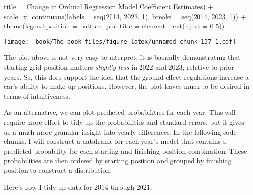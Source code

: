 \documentclass[
]{book}
\newenvironment{Shaded}{\begin{snugshade}}{\end{snugshade}}
\newcommand{\AttributeTok}[1]{\textcolor[rgb]{0.77,0.63,0.00}{#1}}
\newcommand{\DecValTok}[1]{\textcolor[rgb]{0.00,0.00,0.81}{#1}}
\newcommand{\FloatTok}[1]{\textcolor[rgb]{0.00,0.00,0.81}{#1}}
\newcommand{\FunctionTok}[1]{\textcolor[rgb]{0.00,0.00,0.00}{#1}}
\newcommand{\NormalTok}[1]{#1}
\newcommand{\SpecialCharTok}[1]{\textcolor[rgb]{0.00,0.00,0.00}{#1}}
\newcommand{\StringTok}[1]{\textcolor[rgb]{0.31,0.60,0.02}{#1}}
\begin{document}
\begin{Shaded}
\begin{Highlighting}[]
       \AttributeTok{title =} \StringTok{\textquotesingle{}Change in Ordinal Regression Model Coefficient Estimates\textquotesingle{}}\NormalTok{) }\SpecialCharTok{+}
  \FunctionTok{scale\_x\_continuous}\NormalTok{(}\AttributeTok{labels =} \FunctionTok{seq}\NormalTok{(}\DecValTok{2014}\NormalTok{, }\DecValTok{2023}\NormalTok{, }\DecValTok{1}\NormalTok{),}
                     \AttributeTok{breaks =} \FunctionTok{seq}\NormalTok{(}\DecValTok{2014}\NormalTok{, }\DecValTok{2023}\NormalTok{, }\DecValTok{1}\NormalTok{)) }\SpecialCharTok{+}
  \FunctionTok{theme}\NormalTok{(}\AttributeTok{legend.position =} \StringTok{\textquotesingle{}bottom\textquotesingle{}}\NormalTok{,}
        \AttributeTok{plot.title =} \FunctionTok{element\_text}\NormalTok{(}\AttributeTok{hjust =} \FloatTok{0.5}\NormalTok{))}
\end{Highlighting}
\end{Shaded}

\texttt{[image: \_book/The-book\_files/figure-latex/unnamed-chunk-137-1.pdf]}

The plot above is not very easy to interpret. It is basically demonstrating that starting grid position matters \emph{slightly less} in 2022 and 2023, relative to prior years. So, this does support the idea that the ground effect regulations increase a car's ability to make up positions. However, the plot leaves much to be desired in terms of intuitiveness.

As an alternative, we can plot predicted probabilities for each year. This will require more effort to tidy up the probabilities and standard errors, but it gives us a much more granular insight into yearly differences. In the following code chunks, I will construct a dataframe for each year's model that contains a predicted probability for each starting and finishing position combination. These probabilities are then ordered by starting position and grouped by finishing position to construct a distribution.

Here's how I tidy up data for 2014 through 2021.
\end{document}
